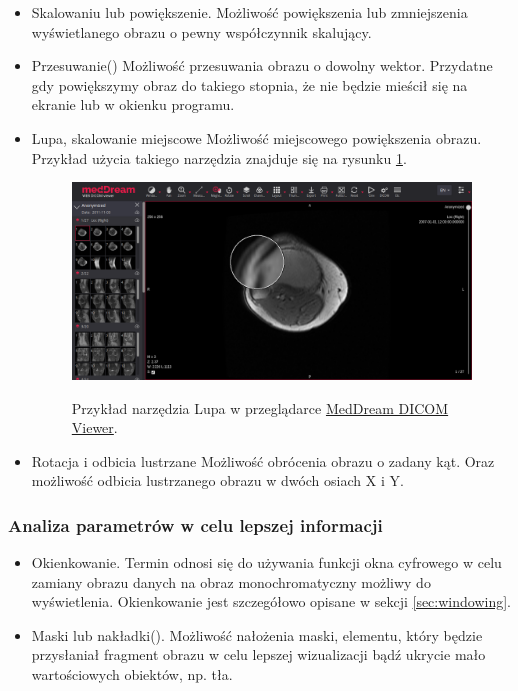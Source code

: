 \begin{itemize}
      \item Skalowaniu lub powiększenie.
            Możliwość powiększenia lub zmniejszenia wyświetlanego obrazu o pewny współczynnik skalujący.

      \item Przesuwanie()
            Możliwość przesuwania obrazu o dowolny wektor.
            Przydatne gdy powiększymy obraz do takiego stopnia, że nie będzie mieścił się na ekranie lub w okienku programu.

      \item Lupa, skalowanie miejscowe
            Możliwość miejscowego powiększenia obrazu.
            Przykład użycia takiego narzędzia znajduje się na rysunku \ref{fig:wyswietlanie001}.

            \begin{figure}[!htbp]
                  \caption{Przykład narzędzia Lupa w przeglądarce \href{https://www.softneta.com/products/meddream-dicom-viewer/}{MedDream DICOM Viewer}.}
                  \includegraphics[width=\textwidth]{img/wyswietlanie001.png}
                  \centering
                  \label{fig:wyswietlanie001}
            \end{figure}

      \item Rotacja i odbicia lustrzane
            Możliwość obrócenia obrazu o zadany kąt.
            Oraz możliwość odbicia lustrzanego obrazu w dwóch osiach X i Y.

\end{itemize}

\subsubsection{Analiza parametrów w celu lepszej informacji}

\begin{itemize}
      \item Okienkowanie.
            Termin odnosi się do używania funkcji okna cyfrowego w celu zamiany obrazu danych na obraz monochromatyczny możliwy do wyświetlenia.
            Okienkowanie jest szczegółowo opisane w sekcji \ref{sec:windowing}.

      \item Maski lub nakładki().
            Możliwość nałożenia maski, elementu, który będzie przysłaniał fragment obrazu w celu lepszej wizualizacji bądź ukrycie mało wartościowych obiektów, np. tła.
\end{itemize}

